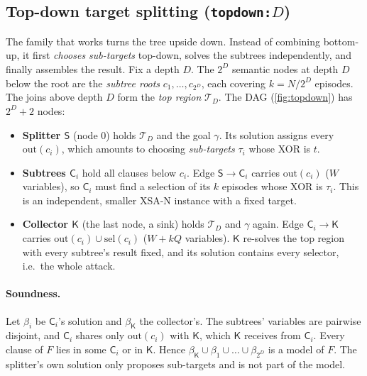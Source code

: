 \documentclass[11pt,a4paper]{article}
\newcommand{\XSA}{\textsf{XSA-N}}
\newcommand{\dfam}[1]{\texttt{#1}}
\newcommand{\outb}{\mathrm{out}}
\newcommand{\selv}{\mathrm{sel}}
\newcommand{\nS}{\mathsf{S}}\newcommand{\nK}{\mathsf{K}}\newcommand{\nC}{\mathsf{C}}
\begin{document}
\subsection{Top-down target splitting (\dfam{topdown:$D$})}
\label{sec:topdown}
The family that works turns the tree upside down. Instead of combining bottom-up, it first
\emph{chooses sub-targets} top-down, solves the subtrees independently, and finally
assembles the result. Fix a depth $D$. The $2^D$ semantic nodes at depth $D$ below the root
are the \emph{subtree roots} $c_1,\dots,c_{2^D}$, each covering $k=N/2^D$ episodes. The
joins above depth $D$ form the \emph{top region} $\mathcal{T}_D$. The DAG
(\cref{fig:topdown}) has $2^D+2$ nodes:
\begin{itemize}
\item \textbf{Splitter $\nS$} (node 0) holds $\mathcal{T}_D$ and the goal $\gamma$. Its
      solution assigns every $\outb(c_i)$, which amounts to choosing \emph{sub-targets}
      $\tau_i$ whose XOR is $t$.
\item \textbf{Subtrees $\nC_i$} hold all clauses below $c_i$. Edge $\nS\to\nC_i$ carries
      $\outb(c_i)$ ($W$ variables), so $\nC_i$ must find a selection of its $k$ episodes
      whose XOR is $\tau_i$. This is an independent, smaller \XSA{} instance with a fixed
      target.
\item \textbf{Collector $\nK$} (the last node, a sink) holds $\mathcal{T}_D$ and $\gamma$
      again. Edge $\nC_i\to\nK$ carries $\outb(c_i)\cup\selv(c_i)$ ($W+kQ$ variables).
      $\nK$ re-solves the top region with every subtree's result fixed, and its solution
      contains every selector, i.e.\ the whole attack.
\end{itemize}

\paragraph{Soundness.}
Let $\beta_i$ be $\nC_i$'s solution and $\beta_{\nK}$ the collector's. The subtrees' variables are
pairwise disjoint, and $\nC_i$ shares only $\outb(c_i)$ with $\nK$, which $\nK$ receives from
$\nC_i$. Every clause of $F$ lies in some $\nC_i$ or in $\nK$. Hence
$\beta_{\nK}\cup\beta_1\cup\dots\cup\beta_{2^D}$ is a model of $F$. The splitter's own solution
only proposes sub-targets and is not part of the model.
\end{document}
